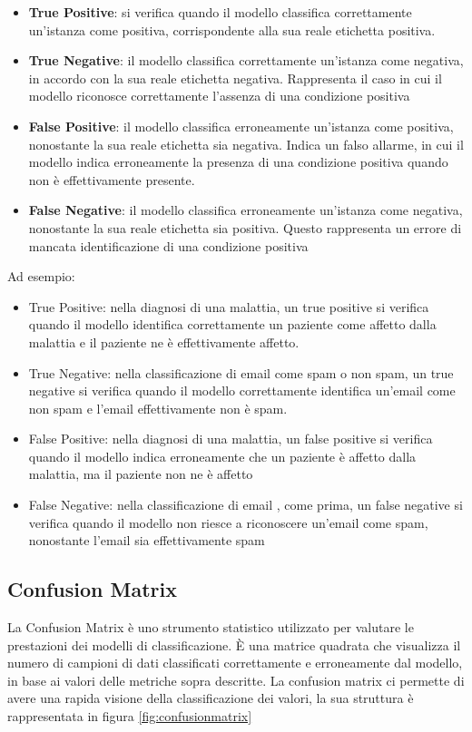 \begin{flushleft}
\begin{itemize}
    \item \textbf{True Positive}: si verifica quando il modello classifica correttamente un'istanza come positiva, corrispondente alla sua reale etichetta positiva.
    \item \textbf{True Negative}: il modello classifica correttamente un'istanza come negativa, in accordo con la sua reale etichetta negativa. Rappresenta il caso in cui il modello riconosce correttamente l'assenza di una condizione positiva

\item \textbf{False Positive}:  il modello classifica erroneamente un'istanza come positiva, nonostante la sua reale etichetta sia negativa. Indica un falso allarme, in cui il modello indica erroneamente la presenza di una condizione positiva quando non è effettivamente presente. 

\item \textbf{False Negative}: il modello classifica erroneamente un'istanza come negativa, nonostante la sua reale etichetta sia positiva. Questo rappresenta un errore di mancata identificazione di una condizione positiva
\end{itemize}
Ad esempio:
\begin{itemize}
    \item True Positive: nella diagnosi di una malattia, un true positive si verifica quando il modello identifica correttamente un paziente come affetto dalla malattia e il paziente  ne è effettivamente affetto. 
    \item True Negative: nella classificazione di email come spam o non spam, un true negative si verifica quando il modello correttamente identifica un'email come non spam e l'email effettivamente non è spam.
    \item False Positive:  nella diagnosi di una malattia, un false positive si verifica quando il modello indica erroneamente che un paziente è affetto dalla malattia, ma il paziente non ne è affetto
    \item False Negative: nella classificazione di email , come prima, un false negative si verifica quando il modello non riesce a riconoscere un'email come spam, nonostante l'email sia effettivamente spam
\end{itemize}


\subsection{Confusion Matrix}
La Confusion Matrix è uno strumento statistico  utilizzato per valutare le prestazioni dei modelli di classificazione.
È una matrice quadrata che visualizza il numero di campioni di dati classificati correttamente e erroneamente dal modello, in base ai valori delle metriche sopra descritte.
La confusion matrix ci permette di avere una rapida visione della classificazione dei valori, la sua struttura è rappresentata in figura \ref{fig:confusionmatrix}


\end{flushleft}
